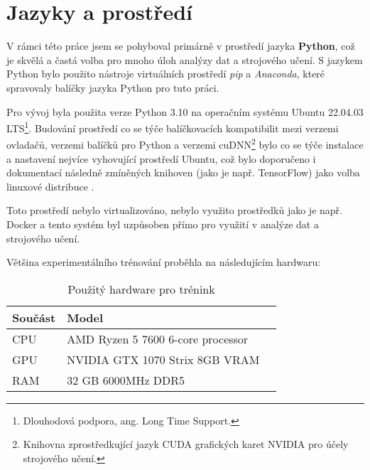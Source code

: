 \section{Jazyky a prostředí}
\label{sec:Chapter51}
V rámci této práce jsem se pohyboval primárně v prostředí jazyka \textbf{Python}, což je skvělá a častá volba pro mnoho úloh analýzy dat a strojového učení. S jazykem Python bylo použito nástroje virtuálních prostředí \textit{pip} a \textit{Anaconda}, které spravovaly balíčky jazyka Python pro tuto práci.

Pro vývoj byla použita verze Python 3.10 na operačním systému Ubuntu 22.04.03 LTS\footnote{Dlouhodová podpora, ang. Long Time Support.}. Budování prostředí co se týče balíčkovacích kompatibilit mezi verzemi ovladačů, verzemi balíčků pro Python a verzemi cuDNN\footnote{Knihovna zprostředkující jazyk CUDA grafických karet NVIDIA pro účely strojového učení.} bylo co se týče instalace a nastavení nejvíce vyhovující prostředí Ubuntu, což bylo doporučeno i dokumentací následně zmíněných knihoven (jako je např. TensorFlow) jako volba linuxové distribuce \cite{tensorflow_install}.

Toto prostředí nebylo virtualizováno, nebylo využito prostředků jako je např. Docker a tento systém byl uzpůsoben přímo pro využití v analýze dat a strojového učení.

Většina experimentálního trénování proběhla na následujícím hardwaru:

\begin{table}[ht]
\centering
\begin{tabular}{@{}lll@{}}
\toprule
Součást & Model \\
\midrule
CPU & AMD Ryzen 5 7600 6-core processor \\
GPU & NVIDIA GTX 1070 Strix 8GB VRAM  \\
RAM & 32 GB 6000MHz DDR5 \\
\bottomrule
\end{tabular}
\caption{Použitý hardware pro trénink}
\label{fig:wortelus_pc}
\end{table}

